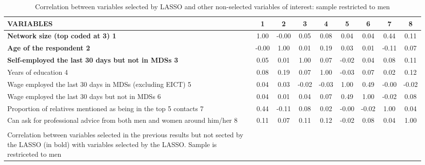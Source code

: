 \begin{landscape}
\begin{longtable}{m{9cm}cccccccc}
\caption{Correlation between variables selected by LASSO and other non-selected variables of interest: sample restricted to men}
\label{tab:lasso_correlation_men'}\\
\toprule
VARIABLES
& 1     & 2 & 3 & 4 & 5 & 6 & 7 & 8
 \\* \midrule
\textbf{Network size (top coded at 3) 1}&1.00&-0.00&0.05&0.08&0.04&0.04&0.44&0.11\\
\textbf{Age of the respondent 2}&-0.00&1.00&0.01&0.19&0.03&0.01&-0.11&0.07\\
\textbf{Self-employed the last 30 days but not  in MDSs 3}&0.05&0.01&1.00&0.07&-0.02&0.04&0.08&0.11\\
Years of education 4&0.08&0.19&0.07&1.00&-0.03&0.07&0.02&0.12\\
Wage employed the last 30 days in MDSs (excluding EICT) 5&0.04&0.03&-0.02&-0.03&1.00&0.49&-0.00&-0.02\\
Wage employed the last 30 days but not  in MDSs 6&0.04&0.01&0.04&0.07&0.49&1.00&-0.02&0.08\\
Proportion of relatives mentioned as being in the top 5 contacts 7&0.44&-0.11&0.08&0.02&-0.00&-0.02&1.00&0.04\\
Can ask for professional advice from both men and women around him/her 8&0.11&0.07&0.11&0.12&-0.02&0.08&0.04&1.00\\
\midrule
\begin{minipage}{21cm}
\small{
{\textit Notes:} \\
Correlation between variables selected in the previous results but not sected by the LASSO (in bold) with variables selected by the LASSO. Sample is restriceted to men
}
\end{minipage} \\* \bottomrule
\end{longtable}
\end{landscape}
